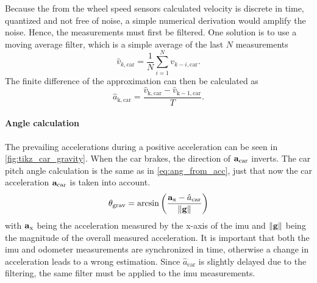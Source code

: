 Because the from the wheel speed sensors calculated velocity is discrete in time, quantized and not free of noise, a simple numerical derivation would amplify the noise.
Hence, the measurements must first be filtered.
One solution is to use a moving average filter, which is a simple average of the last $N$ measurements
\begin{equation}
	\hat{v}_{k, \mathrm{car}} = \frac{1}{N}\sum_{i=1}^N v_{k - i, \mathrm{car}}.
\end{equation}
The finite difference of the approximation can then be calculated as
\begin{equation}
	\label{eq:v_car_diff}
	\hat{a}_\mathrm{k, car} = \frac{\hat{v}_\mathrm{k, car} - \hat{v}_\mathrm{k - 1, car}}{T}.
\end{equation}

\paragraph{Angle calculation}\mbox{}\par
The prevailing accelerations during a positive acceleration can be seen in \cref{fig:tikz_car_gravity}.
When the car brakes, the direction of $\vb{a}_\mathrm{car}$ inverts.
The car pitch angle calculation is the same as in \cref{eq:ang_from_acc}, just that now the car acceleration $\vb{a}_\mathrm{car}$ is taken into account.
\begin{equation}
	\label{eq:ang_from_acc_gravity}
	\theta_\mathrm{grav}  = \arcsin\left(\frac{\vb{a}_\mathrm{x} - \hat{a}_\mathrm{car}}{\norm{\vb{g}}}\right)
\end{equation}
with $\vb{a}_\mathrm{x}$ being the acceleration measured by the x-axis of the \gls{imu} and $\norm{\vb{g}}$ being the magnitude of the overall measured acceleration.
It is important that both the \gls{imu} and odometer measurements are synchronized in time, otherwise a change in acceleration leads to a wrong estimation.
Since $\hat{a}_\mathrm{car}$ is slightly delayed due to the filtering, the same filter must be applied to the \gls{imu} measurements.


